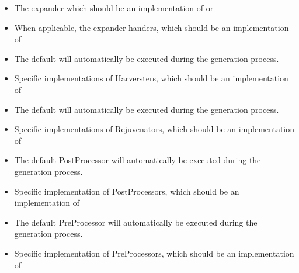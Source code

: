 \begin{itemize}
    \item The expander which should be an implementation of
     or 
    \item When applicable, the expander handers, which should be an implementation of 
    \item The default  will automatically be
    executed during the generation process.
    \item Specific implementations of Harversters, which should be an implementation of  
    \item The default  will automatically be
    executed during the generation process.
    \item Specific implementations of Rejuvenators, which should be an implementation of 
    \item The default PostProcessor  will automatically be
    executed during the generation process.
    \item Specific implementation of PostProcessors, which should be an implementation of 
    \item The default PreProcessor  will automatically be
    executed during the generation process.
    \item Specific implementation of PreProcessors, which should be an implementation of 
\end{itemize}

